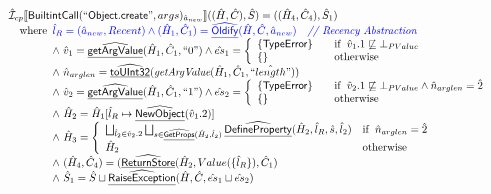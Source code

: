 \[
\begin{array}{l}
\aI _{cp}\lbr \SF{BuiltintCall}(``\SF{Object.create}",args)_{\hat{a}_{new}}\rbr((\hat{H},\hat{C}), \hat{S})
  = ((\hat{H}_4, \hat{C}_4), \hat{S}_1)\\
\quad\wherec{
  \inblue\hat{l}_{R} = (\hat{a}_{new}, Recent)
  \land \inblue (\hat{H}_1, \hat{C}_1) = \ahf{Oldify}(\hat{H}, \hat{C}, \hat{a}_{new})
     \quad\comment{{\inblue // Recency Abstraction}}\\
  \land\ \hat{v}_1 =\ahf{getArgValue}(\hat{H}_1, \hat{C}_1, ``0")
  \land \hat{es}_1 =
    \left\{
    \begin{array}{l@{\quad\quad}l}
      \{ \SF{TypeError} \} & \ifc{\hat{v}_1.1 \not\sqsubseteq \bot_{PValue}}\\
      \{ \}& \owc\\
    \end{array}
    \right.\\
  \land\ \hat{n}_{arglen} = \ahf{toUInt32}(\hf{getArgValue}(\hat{H}_1, \hat{C}_1, \hat{``length"}))\\
  \land\ \hat{v}_2 =\ahf{getArgValue}(\hat{H}_1, \hat{C}_1, ``1")
  \land \hat{es}_2 =
    \left\{
    \begin{array}{l@{\quad\quad}l}
      \{ \SF{TypeError} \} & \ifc{\hat{v}_2.1 \not\sqsubseteq \bot_{PValue} \land \hat{n}_{arglen} = \hat{2}}\\
      \{ \}& \owc\\
    \end{array}
    \right.\\
  \land\ \hat{H}_2 = \hat{H}_1[\hat{l}_R \mapsto \ahf{NewObject}(\hat{v}_1.2)]\\
  \land\ \hat{H}_3 = \left\{\begin{array}{ll}
      \bigsqcup_{\hat{l}_2 \in \hat{v}_2.2} \bigsqcup_{s \in \ahf{GetProps}(\hat{H}_2, \hat{l}_2)}
        \ahf{DefineProperty}(\hat{H}_2, \hat{l}_R, \hat{s}, \hat{l}_2)
      & \ifc{\hat{n}_{arglen} = \hat{2}}\\
      \hat{H}_2 & \owc
    \end{array}\right.\\
  \land\ (\hat{H}_4, \hat{C}_4) = (\ahf{ReturnStore}(\hat{H}_2, Value(\{ \hat{l}_R\}), \hat{C}_1)\\
  \land\ \hat{S}_1 = \hat{S} \sqcup \ahf{RaiseException}(\hat{H}, \hat{C}, \hat{es}_1 \sqcup \hat{es}_2)\\
  }\\
\\\\ 



\end{array}\]
